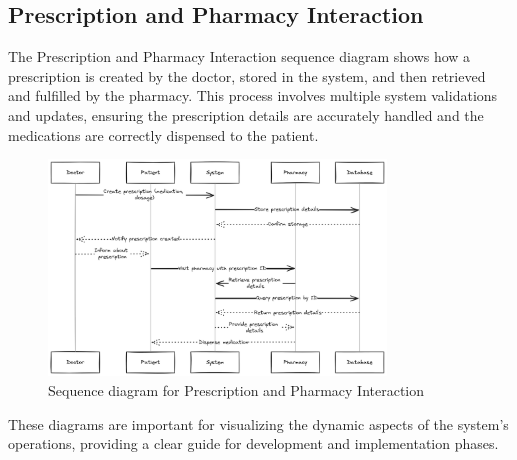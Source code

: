 \documentclass[12pt]{article}
\begin{document}
\newpage


\subsection*{Prescription and Pharmacy Interaction}
The Prescription and Pharmacy Interaction sequence diagram shows how a prescription is created by the doctor, stored in the system, and then retrieved and fulfilled by the pharmacy. This process involves multiple system validations and updates, ensuring the prescription details are accurately handled and the medications are correctly dispensed to the patient.

\begin{figure}[h!]
\centering
\includegraphics[width=0.8\textwidth]{prescription_pharmacy_interaction_diagram.png}
\caption{Sequence diagram for Prescription and Pharmacy Interaction}
\end{figure}

These diagrams are important for visualizing the dynamic aspects of the system's operations, providing a clear guide for development and implementation phases.

\noindent\hrulefill
\end{document}
